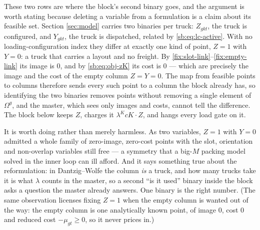 These two rows are where the block's second binary goes, and the
argument is worth stating because deleting a variable from a
formulation is a claim about its feasible set. Section \ref{sec:model}
carries two binaries per truck: $Z_{gkt}$, the truck is configured, and
$Y_{gkt}$, the truck is dispatched, related by \eqref{sb:eq:lc-active}.
With no loading-configuration index they differ at exactly one kind of
point, $Z=1$ with $Y=0$: a truck that carries a layout and no freight.
By \eqref{fix:slot-link}--\eqref{fix:empty-link} its image is $0$, and
by \eqref{sb:eq:obj-zK} its cost is $0$ --- which are precisely the
image and the cost of the empty column $Z=Y=0$. The map from feasible
points to columns therefore sends every such point to a column the
block already has, so identifying the two binaries removes points
without removing a single element of $\Omega^{g}$, and the master,
which sees only images and costs, cannot tell the difference. The
block below keeps $Z$, charges it $\lambda^{K}cK\cdot Z$, and hangs
every load gate on it.

It is worth doing rather than merely harmless. As two variables, $Z=1$
with $Y=0$ admitted a whole family of zero-image, zero-cost points with
the slot, orientation and non-overlap variables still free --- a
symmetry that a big-$M$ packing model solved in the inner loop can ill
afford. And it says something true about the reformulation: in
Dantzig--Wolfe the column \emph{is} a truck, and how many trucks take
it is what $\lambda$ counts in the master, so a second ``is it used''
binary inside the block asks a question the master already answers. One
binary is the right number. (The same observation licenses fixing $Z=1$
when the empty column is wanted out of the way: the empty column is one
analytically known point, of image $0$, cost $0$ and reduced cost
$-\mu_{gt}\ge0$, so it never prices in.)

